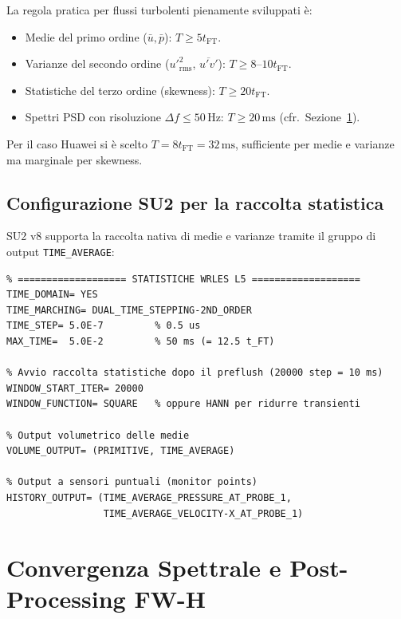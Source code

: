 \documentclass[11pt,a4paper]{article}
\newcommand{\ttcfg}[1]{\texttt{\color{codegray}#1}}
\providecommand{\ms}{}\renewcommand{\ms}{\,\mathrm{ms}}
\newcommand{\tFT}{t_{\mathrm{FT}}}
\begin{document}
\begin{infobox}[Quanti $\tFT$ servono?]
La regola pratica per flussi turbolenti pienamente sviluppati è:
\begin{itemize}
  \item Medie del primo ordine ($\bar u, \bar p$): $T \geq 5\tFT$.
  \item Varianze del secondo ordine ($u'^2_{\mathrm{rms}}$, $\overline{u'v'}$):
    $T \geq 8$--$10\tFT$.
  \item Statistiche del terzo ordine (skewness): $T \geq 20\tFT$.
  \item Spettri PSD con risoluzione $\Delta f \leq 50$\,Hz: $T \geq
    20\,\mathrm{ms}$ (cfr.\ Sezione~\ref{sec:welch}).
\end{itemize}
Per il caso Huawei si è scelto $T = 8\tFT = 32\ms$, sufficiente per
medie e varianze ma marginale per skewness.
\end{infobox}

\subsection{Configurazione SU2 per la raccolta statistica}

SU2 v8 supporta la raccolta nativa di medie e varianze tramite il
gruppo di output \ttcfg{TIME\_AVERAGE}:

\begin{lstlisting}
% =================== STATISTICHE WRLES L5 ===================
TIME_DOMAIN= YES
TIME_MARCHING= DUAL_TIME_STEPPING-2ND_ORDER
TIME_STEP= 5.0E-7         % 0.5 us
MAX_TIME=  5.0E-2         % 50 ms (= 12.5 t_FT)

% Avvio raccolta statistiche dopo il preflush (20000 step = 10 ms)
WINDOW_START_ITER= 20000
WINDOW_FUNCTION= SQUARE   % oppure HANN per ridurre transienti

% Output volumetrico delle medie
VOLUME_OUTPUT= (PRIMITIVE, TIME_AVERAGE)

% Output a sensori puntuali (monitor points)
HISTORY_OUTPUT= (TIME_AVERAGE_PRESSURE_AT_PROBE_1,
                 TIME_AVERAGE_VELOCITY-X_AT_PROBE_1)
\end{lstlisting}

\section{Convergenza Spettrale e Post-Processing FW-H}
\label{sec:welch}
\end{document}
